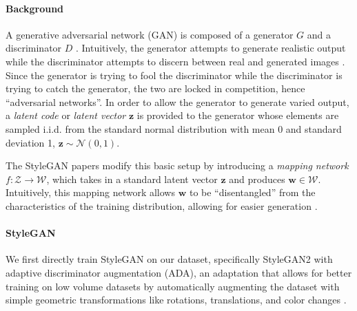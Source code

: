 \documentclass[11pt, oneside]{article}
\begin{document}
\paragraph{Background}
A generative adversarial network (GAN) is composed of a generator \( G \) and
a discriminator \( D \) \cite{gans}. Intuitively, the generator attempts to
generate realistic output while the discriminator attempts to discern between
real and generated images \cite{gans}. Since the generator is trying to fool
the discriminator while the discriminator is trying to catch the generator,
the two are locked in competition, hence \enquote{adversarial networks}. In
order to allow the generator to generate varied output, a \textit{latent code}
or \textit{latent vector} \( \bm{z} \) is provided to the generator whose
elements are sampled i.i.d. from the standard normal distribution with mean
0 and standard deviation 1, \( \bm{z} \sim \mathcal{N}(0, 1) \).

The StyleGAN papers \cite{stylegan, stylegan2} modify this basic setup by
introducing a \textit{mapping network} \( f: \mathcal{Z} \to \mathcal{W}
\), which takes in a standard latent vector \( \bm{z} \) and produces \(
\bm{w} \in \mathcal{W} \). Intuitively, this mapping network allows \(
\bm{w} \) to be \enquote{disentangled} from the characteristics of the
training distribution, allowing for easier generation \cite{stylegan}.

\paragraph{StyleGAN}
We first directly train StyleGAN on our dataset, specifically StyleGAN2
with adaptive discriminator augmentation (ADA), an adaptation that allows
for better training on low volume datasets by automatically augmenting the
dataset with simple geometric transformations like rotations, translations,
and color changes \cite{stylegan2ada}.
\end{document}

